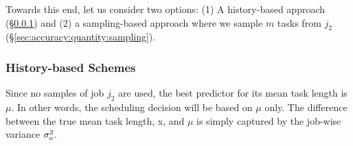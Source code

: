 
Towards this end, let us consider two options: (1) A history-based approach
(\S\ref{sec:accuracy:quantity:history}) and (2) a sampling-based approach where
we sample $m$ tasks from $j_2$ (\S\ref{sec:accuracy:quantity:sampling}).

\subsubsection{History-based Schemes}
\label{sec:accuracy:quantity:history}
Since no samples of job $j_2$ are used, the best predictor for its mean task
length is $\mu$.
In other words, the scheduling decision will be based on $\mu$ only. The difference between the
true mean task length, x, and $\mu$ is simply captured by the job-wise variance
$\sigma_o^2$.


